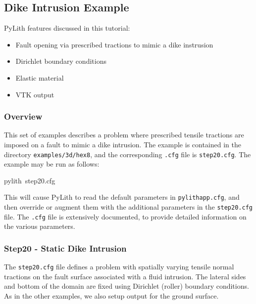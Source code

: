 
\subsection{\label{sec:Tutorial-3d-hex8-dike}Dike Intrusion Example}

PyLith features discussed in this tutorial:
\begin{itemize}
\item Fault opening via prescribed tractions to mimic a dike instrusion
\item Dirichlet boundary conditions
\item Elastic material
\item VTK output
\end{itemize}

\subsubsection{Overview}

This set of examples describes a problem where prescribed tensile
tractions are imposed on a fault to mimic a dike intrusion. The example
is contained in the directory \texttt{examples/3d/hex8}, and the corresponding
\texttt{.cfg} file is \texttt{step20.cfg}. The example may be run
as follows:
\begin{lyxcode}
pylith~step20.cfg
\end{lyxcode}
This will cause PyLith to read the default parameters in \texttt{pylithapp.cfg},
and then override or augment them with the additional parameters in
the \texttt{step20.cfg} file. The \texttt{.cfg} file is extensively
documented, to provide detailed information on the various parameters.


\subsubsection{Step20 - Static Dike Intrusion}

The \texttt{step20.cfg} file defines a problem with spatially varying
tensile normal tractions on the fault surface associated with a fluid
intrusion. The lateral sides and bottom of the domain are fixed using
Dirichlet (roller) boundary conditions. As in the other examples,
we also setup output for the ground surface.

